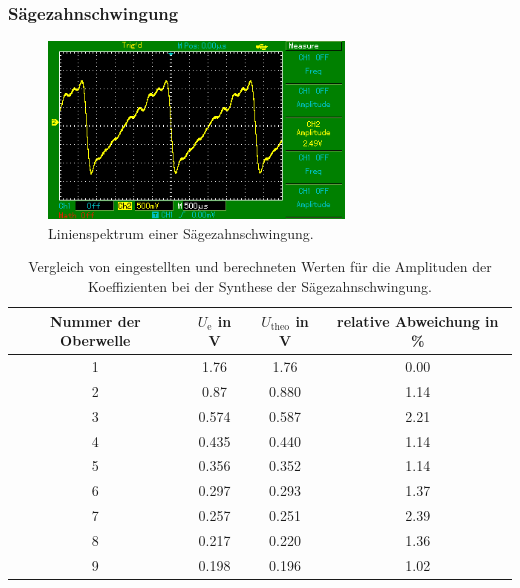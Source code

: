 \subsubsection{Sägezahnschwingung}
\begin{figure}
  \centering
  \includegraphics[width=0.7\textwidth]{saegezahn.png}
  \caption{Linienspektrum einer Sägezahnschwingung.}
  \label{fig:saegezahn_synthese}
\end{figure}
\begin{table}
  \centering
  \begin{tabular}{c c c c}
    \toprule
    Nummer der Oberwelle & $U_\text{e}$ in \si{\volt} &
    $U_\text{theo}$ in \si{\volt} & relative Abweichung in \% \\
    \midrule
    1 & 1.76  & 1.76  & 0.00 \\
    2 & 0.87  & 0.880 & 1.14 \\
    3 & 0.574 & 0.587 & 2.21 \\
    4 & 0.435 & 0.440 & 1.14 \\
    5 & 0.356 & 0.352 & 1.14 \\
    6 & 0.297 & 0.293 & 1.37 \\
    7 & 0.257 & 0.251 & 2.39 \\
    8 & 0.217 & 0.220 & 1.36 \\
    9 & 0.198 & 0.196 & 1.02 \\
    \bottomrule
  \end{tabular}
  \caption{Vergleich von eingestellten und berechneten Werten für die Amplituden
    der Koeffizienten bei der Synthese der Sägezahnschwingung.}
  \label{tab:synthese_saegezahn}
\end{table}

\newpage
